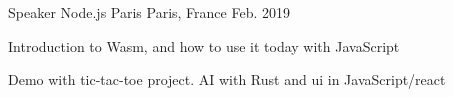

\begin{cventries}

  \cventry
    {Speaker} %
    {Node.js Paris} %
    {Paris, France} %
    {Feb. 2019} %
    {
      \begin{cvitems} %
        \item {Introduction to Wasm, and how to use it today with JavaScript}
        \item {Demo with tic-tac-toe project. AI with Rust and ui in JavaScript/react}
      \end{cvitems}
    }

\end{cventries}

